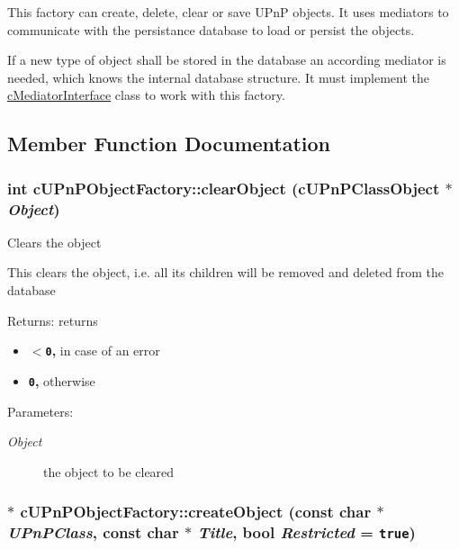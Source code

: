 This factory can create, delete, clear or save UPnP objects. It uses mediators to communicate with the persistance database to load or persist the objects.

If a new type of object shall be stored in the database an according mediator is needed, which knows the internal database structure. It must implement the \hyperlink{classcMediatorInterface}{cMediatorInterface} class to work with this factory. 

\subsection{Member Function Documentation}
\hypertarget{classcUPnPObjectFactory_947c7256906b4dbe63d156723cdc38be}{
\subsubsection[{clearObject}]{\setlength{\rightskip}{0pt plus 5cm}int cUPnPObjectFactory::clearObject ({\bf cUPnPClassObject} $\ast$ {\em Object})}}
\label{classcUPnPObjectFactory_947c7256906b4dbe63d156723cdc38be}


Clears the object

This clears the object, i.e. all its children will be removed and deleted from the database

\begin{Desc}
\item[Returns:]returns\begin{itemize}
\item {\bf {\tt $<$0},} in case of an error\item {\bf {\tt 0},} otherwise \end{itemize}
\end{Desc}
\begin{Desc}
\item[Parameters:]
\begin{description}
\item[{\em Object}]the object to be cleared \end{description}
\end{Desc}
 \hypertarget{classcUPnPObjectFactory_c71bbdb30be6b0fd17f67b8850aeccdb}{
\subsubsection[{createObject}]{ $\ast$ cUPnPObjectFactory::createObject (const char $\ast$ {\em UPnPClass}, \/  const char $\ast$ {\em Title}, \/  bool {\em Restricted} = {\tt true})}}
\label{classcUPnPObjectFactory_c71bbdb30be6b0fd17f67b8850aeccdb}


